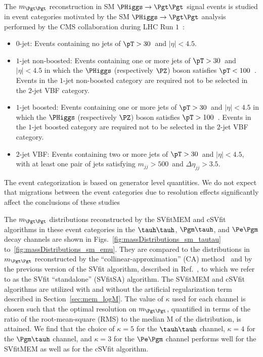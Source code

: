 The $m_{\Pgt\Pgt}$ reconstruction in SM $\PHiggs \to \Pgt\Pgt$ signal events is studied in event categories motivated by the
SM $\PHiggs \to \Pgt\Pgt$ analysis performed by the CMS collaboration during LHC Run $1$~\cite{HIG-13-004}:
\begin{itemize}
\item $0$-jet: 
  Events containing no jets of $\pT > 30$~\GeV and $\lvert \eta \rvert < 4.5$.
\item $1$-jet non-boosted:
  Events containing one or more jets of $\pT > 30$~\GeV and $\lvert \eta \rvert < 4.5$
  in which the $\PHiggs$ (respectively $\PZ$) boson satisfies $\pT < 100$~\GeV.
  Events in the $1$-jet non-boosted category are required not to be selected in the $2$-jet VBF category.
\item $1$-jet boosted:
  Events containing one or more jets of $\pT > 30$~\GeV and $\lvert \eta \rvert < 4.5$
  in which the $\PHiggs$ (respectively $\PZ$) boson satisfies $\pT > 100$~\GeV.
  Events in the $1$-jet boosted category are required not to be selected in the $2$-jet VBF category.
\item $2$-jet VBF:
  Events containing two or more jets of $\pT > 30$~\GeV and $\lvert \eta \rvert < 4.5$,
  with at least one pair of jets satisfying $m_{jj} > 500$~\GeV and $\Delta\eta_{jj} > 3.5$.
\end{itemize}
The event categorization is based on generator level quantities.
We do not expect that migrations between the event categories due to resolution effects 
significantly affect the conclusions of these studies

The $m_{\Pgt\Pgt}$ distributions reconstructed by the SVfitMEM and cSVfit algorithms in these event categories 
in the $\tauh\tauh$, $\Pgm\tauh$, and $\Pe\Pgm$ decay channels are shown in Figs.~\ref{fig:massDistributions_sm_tautau} to~\ref{fig:massDistributions_sm_emu}.
They are compared to the distributions in $m_{\Pgt\Pgt}$  reconstructed by the ``collinear-approximation'' (CA) method~\cite{massRecoCollinearApprox}
and by the previous version of the
SVfit algorithm, described in Ref.~\cite{SVfit}, to which we refer to as the SVfit ``standalone'' (SVfitSA) algorithm.
The SVfitMEM and cSVfit algorithms are utilized with and without the artificial regularization term described in Section~\ref{sec:mem_logM}.
The value of $\kappa$ used for each channel is chosen such that the optimal resolution on $m_{\Pgt\Pgt}$, 
quantified in terms of the ratio of the root-mean-square (RMS) to the median $\textrm{M}$ of the distribution,
is attained.
We find that the choice of $\kappa = 5$ for the $\tauh\tauh$ channel, $\kappa = 4$ for the $\Pgm\tauh$ channel,
and $\kappa = 3$ for the $\Pe\Pgm$ channel performs well for the SVfitMEM as well as for the cSVfit algorithm.

